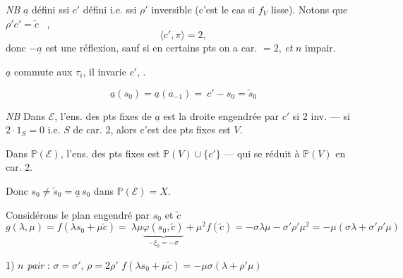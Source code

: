 \documentclass[11pt,a4paper]{article}
\begin{document}
\emph{NB} $\underline{a}$ défini ssi $c'$ défini i.e. ssi $\rho'$ inversible
(c'est le cas si $f_V$ lisse). Notons que $\rho' c' = \tilde{c}$
\ill{}\ \ill{},
\[
\langle c', \pi \rangle = 2,
\]
donc $-\underline{a}$ est une réflexion, sauf si en certains pts on a car.
$= 2$, \emph{et} \struck{\ill{}} \struck{\ill{}} $n$ impair.

$\underline{a}$ commute aux $\tau_i$, il invarie $c'$, .

\[
\underline{a}(s_0) = \underline{a}(a_{-1}) = \ c' - s_0 = \tilde{s}_0
\]


\emph{NB} Dans $\mathcal{E}$, l'ens. des pts fixes de $\underline{a}$ est
\struck{\ill{}} la droite engendrée par $c'$ si 2 inv. --- si $2 \cdot 1_S =
0$ i.e. $S$ de car. 2, alors c'est  des pts fixes est $V$.

Dans $\mathbb{P}(\mathcal{E})$, l'ens. des pts fixes est $\mathbb{P}(V) \cup
\lbrace c' \rbrace$ --- qui se réduit à $\mathbb{P}(V)$ en car. 2.

Donc $s_0 \neq \tilde{s}_0 = \underline{a}\, s_0$ dans $\mathbb{P}(\mathcal{E}) = X$.

Considérons le  plan engendré par $s_0$ et $\tilde{c}$
\struck{\ill{}}
\[
g(\lambda, \mu) = f(\lambda s_0 + \mu\tilde{c}) = \
\lambda\mu \underbrace{\varphi(s_0, \tilde{c})}_{-\xi_0 = -\sigma}
+ \mu^2 f(\tilde{c}) = -\sigma\lambda\mu - \sigma'\rho'\mu^2
= -\mu(\sigma\lambda + \sigma'\rho'\mu)
\]

1) \emph{$n$ pair} : $\sigma = \sigma'$, $\rho = 2\rho'$
\qquad $f(\lambda s_0 + \mu\tilde{c}) = -\mu\sigma(\lambda + \rho'\mu)$
\end{document}
